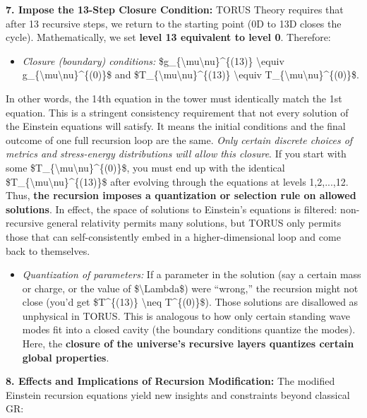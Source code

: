 \documentclass[]{article}
\begin{document}
\textbf{7. Impose the 13-Step Closure Condition:} TORUS Theory requires
that after 13 recursive steps, we return to the starting point (0D to
13D closes the cycle). Mathematically, we set \textbf{level 13
equivalent to level 0}. Therefore:

\begin{itemize}
\item
  \emph{Closure (boundary) conditions:}
  \$g\_\{\textbackslash{}mu\textbackslash{}nu\}\^{}\{(13)\}
  \textbackslash{}equiv
  g\_\{\textbackslash{}mu\textbackslash{}nu\}\^{}\{(0)\}\$ and
  \$T\_\{\textbackslash{}mu\textbackslash{}nu\}\^{}\{(13)\}
  \textbackslash{}equiv
  T\_\{\textbackslash{}mu\textbackslash{}nu\}\^{}\{(0)\}\$​.
\end{itemize}

In other words, the 14th equation in the tower must identically match
the 1st equation. This is a stringent consistency requirement that not
every solution of the Einstein equations will satisfy. It means the
initial conditions and the final outcome of one full recursion loop are
the same. \emph{Only certain discrete choices of metrics and
stress-energy distributions will allow this closure}. If you start with
some \$T\_\{\textbackslash{}mu\textbackslash{}nu\}\^{}\{(0)\}\$, you
must end up with the identical
\$T\_\{\textbackslash{}mu\textbackslash{}nu\}\^{}\{(13)\}\$ after
evolving through the equations at levels 1,2,...,12. Thus, \textbf{the
recursion imposes a quantization or selection rule on allowed
solutions}​. In effect, the space of solutions to Einstein's equations
is filtered: non-recursive general relativity permits many solutions,
but TORUS only permits those that can self-consistently embed in a
higher-dimensional loop and come back to themselves.

\begin{itemize}
\item
  \emph{Quantization of parameters:} If a parameter in the solution (say
  a certain mass or charge, or the value of \$\textbackslash{}Lambda\$)
  were ``wrong,'' the recursion might not close (you'd get
  \$T\^{}\{(13)\} \textbackslash{}neq T\^{}\{(0)\}\$). Those solutions
  are disallowed as unphysical in TORUS. This is analogous to how only
  certain standing wave modes fit into a closed cavity (the boundary
  conditions quantize the modes). Here, the \textbf{closure of the
  universe's recursive layers quantizes certain global properties}.
\end{itemize}

\textbf{8. Effects and Implications of Recursion Modification:} The
modified Einstein recursion equations yield new insights and constraints
beyond classical GR:
\end{document}
